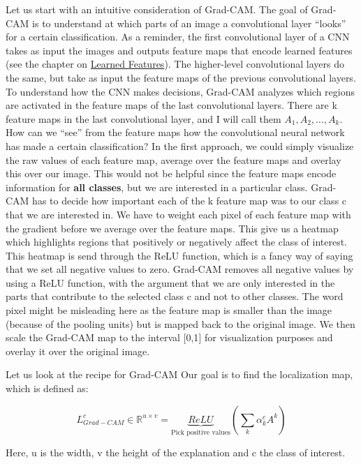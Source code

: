 \documentclass[
  12pt,
]{krantz}
\begin{document}
Let us start with an intuitive consideration of Grad-CAM.
The goal of Grad-CAM is to understand at which parts of an image a convolutional layer ``looks'' for a certain classification.
As a reminder, the first convolutional layer of a CNN takes as input the images and outputs feature maps that encode learned features (see the chapter on \protect\hyperlink{cnn-features}{Learned Features}).
The higher-level convolutional layers do the same, but take as input the feature maps of the previous convolutional layers.
To understand how the CNN makes decisions, Grad-CAM analyzes which regions are activated in the feature maps of the last convolutional layers.
There are k feature maps in the last convolutional layer, and I will call them \(A_1, A_2, \ldots, A_k\).
How can we ``see'' from the feature maps how the convolutional neural network has made a certain classification?
In the first approach, we could simply visualize the raw values of each feature map, average over the feature maps and overlay this over our image.
This would not be helpful since the feature maps encode information for \textbf{all classes}, but we are interested in a particular class.
Grad-CAM has to decide how important each of the k feature map was to our class c that we are interested in.
We have to weight each pixel of each feature map with the gradient before we average over the feature maps.
This give us a heatmap which highlights regions that positively or negatively affect the class of interest.
This heatmap is send through the ReLU function, which is a fancy way of saying that we set all negative values to zero.
Grad-CAM removes all negative values by using a ReLU function, with the argument that we are only interested in the parts that contribute to the selected class c and not to other classes.
The word pixel might be misleading here as the feature map is smaller than the image (because of the pooling units) but is mapped back to the original image.
We then scale the Grad-CAM map to the interval {[}0,1{]} for visualization purposes and overlay it over the original image.

Let us look at the recipe for Grad-CAM
Our goal is to find the localization map, which is defined as:

\[L^c_{Grad-CAM} \in \mathbb{R}^{u\times v} = \underbrace{ReLU}_{\text{Pick positive values}}\left(\sum_{k} \alpha_k^c A^k\right)\]

Here, u is the width, v the height of the explanation and c the class of interest.
\end{document}
